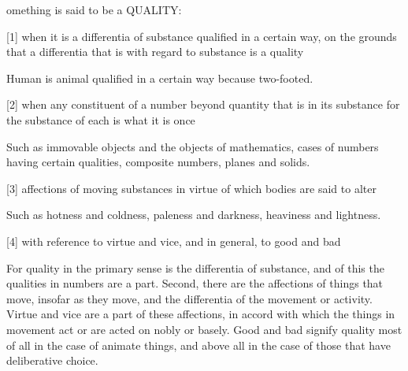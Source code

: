 
omething is said to be a QUALITY:

[1]     when it is a differentia of substance qualified in a certain way,
        on the grounds that a differentia that is with regard to substance is a quality

        Human is animal qualified in a certain way because two-footed.

[2]     when any constituent of a number beyond quantity that is in its substance
        for the substance of each is what it is once

        Such as immovable objects and the objects of mathematics,
        cases of numbers having certain qualities, composite numbers, planes and solids.

[3]     affections of moving substances in virtue of which bodies are said to alter

        Such as hotness and coldness, paleness and darkness, heaviness and lightness.

[4]     with reference to virtue and vice, and in general, to good and bad

For quality in the primary sense is the differentia of substance,
and of this the qualities in numbers are a part.
Second, there are the affections of things that move,
insofar as they move, and the differentia of the movement or activity.
Virtue and vice are a part of these affections,
in accord with which the things in movement act or are acted on nobly or basely.
Good and bad signify quality most of all in the case of animate things,
and above all in the case of those that have deliberative choice.
